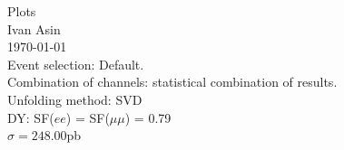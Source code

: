 \documentclass[12pt, a4paper, titlepage]{article}
\author{Ivan Asin}
\date{\today}
\begin{document}
\begin{titlepage}
\begin{center}
\LARGE{Plots}\\
\large{Ivan Asin}\\
\today\\
\vspace{3cm}
Event selection: Default.\\
Combination of channels: statistical combination of results.\\
Unfolding method: SVD\\
DY: SF($ee$) = SF($\mu\mu$) = 0.79\\
$\sigma = 248.00$pb
\end{center}
\end{titlepage}



\clearpage
\newpage


\graphicspath{{./Plots_Nominal/Nominal/emu/}}

\clearpage
\newpage

% 


\clearpage
\newpage


\clearpage
\newpage



% 
% 
% 
% 
% 
% 
% 
% 
% 
\end{document}
